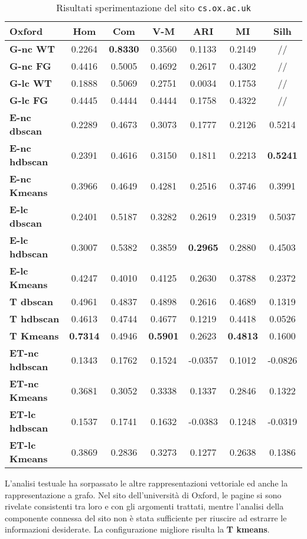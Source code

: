 \begin{table}[H]
	\begin{tabular}{| l | c | c | c | c | c | c |}
	\hline
	\textbf{Oxford}  & \textbf{Hom} & \textbf{Com} & \textbf{V-M}  & \textbf{ARI}  & \textbf{MI} & \textbf{Silh} \\ [2ex] \hline
	\textbf{G-nc WT} & 0.2264 & \textbf{0.8330} & 0.3560 & 0.1133 & 0.2149 & // \\ [2ex]
	 \hline
	\textbf{G-nc FG} & 0.4416 & 0.5005 & 0.4692 & 0.2617 & 0.4302 & // \\ [2ex]
	 \hline	
	\textbf{G-lc WT} & 0.1888 & 0.5069 & 0.2751 & 0.0034 & 0.1753 & // \\ [2ex]
	 \hline	
	\textbf{G-lc FG} & 0.4445 & 0.4444 & 0.4444 & 0.1758 & 0.4322 & // \\ [2ex]
	\hline

	\textbf{E-nc dbscan} & 0.2289 & 0.4673 & 0.3073 & 0.1777 & 0.2126 & 0.5214 \\ [2ex]
	 \hline 
	\textbf{E-nc hdbscan} & 0.2391 & 0.4616 & 0.3150 & 0.1811 & 0.2213 & \textbf{0.5241} \\ [2ex]
	 \hline
	\textbf{E-nc Kmeans} & 0.3966 & 0.4649 & 0.4281 & 0.2516 & 0.3746 & 0.3991 \\ [2ex]
	 \hline	
	\textbf{E-lc dbscan} & 0.2401 & 0.5187 & 0.3282 & 0.2619 & 0.2319 & 0.5037 \\ [2ex]
	\hline
	\textbf{E-lc hdbscan} & 0.3007 & 0.5382 & 0.3859 & \textbf{0.2965} & 0.2880 & 0.4503 \\ [2ex]
	\hline
	\textbf{E-lc Kmeans} & 0.4247 & 0.4010 & 0.4125 & 0.2630 & 0.3788 & 0.2372 \\ [2ex]
	\hline
	
	\textbf{T dbscan} & 0.4961 & 0.4837 & 0.4898 & 0.2616 & 0.4689 & 0.1319 \\ [2ex]
	\hline
	\textbf{T hdbscan} & 0.4613 & 0.4744 & 0.4677 & 0.1219 & 0.4418 & 0.0526 \\ [2ex]
	\hline
	\textbf{T Kmeans} & \textbf{0.7314} & 0.4946 & \textbf{0.5901} & 0.2623 & \textbf{0.4813} & 0.1600 \\ [2ex]
	\hline
	
	\textbf{ET-nc hdbscan} & 0.1343 & 0.1762 & 0.1524 & -0.0357 & 0.1012 & -0.0826 \\ [2ex]
	 \hline
	\textbf{ET-nc Kmeans} & 0.3681 & 0.3052 & 0.3338 & 0.1337 & 0.2846 & 0.1322 \\ [2ex]
	 \hline	
	\textbf{ET-lc hdbscan} & 0.1537 & 0.1741 & 0.1632 & -0.0383 & 0.1248 & -0.0319 \\ [2ex]
	\hline
	\textbf{ET-lc Kmeans} & 0.3869 & 0.2836 & 0.3273 & 0.1277 & 0.2638 & 0.1386 \\ [2ex]
	\hline
	\end{tabular}
	\caption{Risultati sperimentazione del sito \texttt{cs.ox.ac.uk}}
	\label{metricheOx}
\end{table}

L'analisi testuale ha sorpassato le altre rappresentazioni vettoriale ed anche la rappresentazione a grafo. Nel sito dell'università di Oxford, le pagine si sono rivelate consistenti tra loro e con gli argomenti trattati, mentre l'analisi della componente connessa del sito non è stata sufficiente per riuscire ad estrarre le informazioni desiderate. 
La configurazione migliore risulta la \textbf{T kmeans}.
